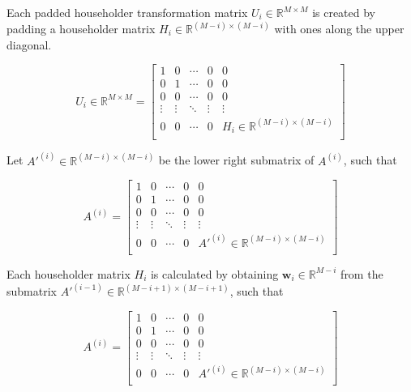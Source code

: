 \documentclass{article}
\begin{document}
Each padded householder transformation matrix $U_{i}\in\mathbb{R}^{M\times{}M}$ is created by padding a householder matrix $H_{i}\in\mathbb{R}^{(M-i)\times{}(M-i)}$ with ones along the upper diagonal.

\begin{equation}
U_{i}\in\mathbb{R}^{M\times{}M} =
\begin{bmatrix}
1 & 0 & \cdots & 0  & 0\\
0 & 1  & \cdots & 0 & 0\\
0 & 0 & \cdots & 0 & 0\\
\vdots & \vdots  & \ddots & \vdots & \vdots\\
0 & 0  & \cdots & 0 & H_{i}\in\mathbb{R}^{(M-i)\times{}(M-i)}\\
\end{bmatrix}
\end{equation}

Let $A'^{(i)}\in\mathbb{R}^{(M-i)\times{}(M-i)}$ be the lower right submatrix of $A^{(i)}$, such that

\begin{equation}
A^{(i)} =
\begin{bmatrix}
1 & 0 & \cdots & 0  & 0\\
0 & 1  & \cdots & 0 & 0\\
0 & 0 & \cdots & 0 & 0\\
\vdots & \vdots  & \ddots & \vdots & \vdots\\
0 & 0  & \cdots & 0 & A'^{(i)}\in\mathbb{R}^{(M-i)\times{}(M-i)}\\
\end{bmatrix}
\end{equation}

Each householder matrix $H_{i}$ is calculated by obtaining $\mathbf{w}_i\in\mathbb{R}^{M-i}$ from the submatrix $A'^{(i-1)}\in\mathbb{R}^{(M-i+1)\times{}(M-i+1)}$, such that

\begin{equation}
A^{(i)} =
\begin{bmatrix}
1 & 0 & \cdots & 0  & 0\\
0 & 1  & \cdots & 0 & 0\\
0 & 0 & \cdots & 0 & 0\\
\vdots & \vdots  & \ddots & \vdots & \vdots\\
0 & 0  & \cdots & 0 & A'^{(i)}\in\mathbb{R}^{(M-i)\times{}(M-i)}\\
\end{bmatrix}
\end{equation}
\end{document}
